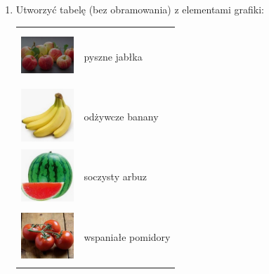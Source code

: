 \documentclass[12 pt, a4paper]{article}
\begin{document}
\begin{enumerate}
\item Utworzyć tabelę (bez obramowania) z elementami grafiki:
    \begin{tabular}{p{2.5cm} p{8cm}}
    \includegraphics[height=2cm, width=2cm]{jablka.jpg}  &   pyszne jabłka \\
    \includegraphics[height=2cm, width=2cm]{banany.jpg} &   odżywcze banany \\
    \includegraphics[height=2cm, width=2cm]{arbuz.jpg}  &   soczysty arbuz \\
    \includegraphics[height=2cm, width=2cm]{pomidory.jpg}   &   wspaniałe pomidory
    \end{tabular}

\end{enumerate}
\end{document}
